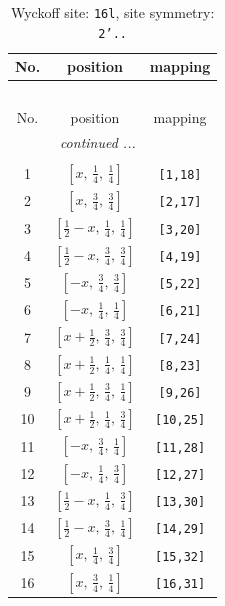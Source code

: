 \documentclass[fleqn,8pt]{jsarticle}
\begin{document}
\renewcommand{\arraystretch}{1.2}
\begin{longtable}{ccc}
\caption{Wyckoff site: {\tt 16l}, site symmetry: {\tt 2'..}}
 \\
 \hline \hline
No. & position & mapping \\ \hline \endfirsthead

\multicolumn{2}{l}{\tablename\ \thetable{}} \\
 \hline \hline
No. & position & mapping \\ \hline \endhead

 \hline \hline
\multicolumn{2}{r}{\footnotesize\it continued ...} \\ \endfoot

 \hline \hline
\multicolumn{2}{r}{} \\ \endlastfoot

1 & $\left[ x,\, \frac{1}{4},\, \frac{1}{4} \right]$ & {\tt [1,18]} \\ \hline
2 & $\left[ x,\, \frac{3}{4},\, \frac{3}{4} \right]$ & {\tt [2,17]} \\ \hline
3 & $\left[ \frac{1}{2} - x,\, \frac{1}{4},\, \frac{1}{4} \right]$ & {\tt [3,20]} \\ \hline
4 & $\left[ \frac{1}{2} - x,\, \frac{3}{4},\, \frac{3}{4} \right]$ & {\tt [4,19]} \\ \hline
5 & $\left[ - x,\, \frac{3}{4},\, \frac{3}{4} \right]$ & {\tt [5,22]} \\ \hline
6 & $\left[ - x,\, \frac{1}{4},\, \frac{1}{4} \right]$ & {\tt [6,21]} \\ \hline
7 & $\left[ x + \frac{1}{2},\, \frac{3}{4},\, \frac{3}{4} \right]$ & {\tt [7,24]} \\ \hline
8 & $\left[ x + \frac{1}{2},\, \frac{1}{4},\, \frac{1}{4} \right]$ & {\tt [8,23]} \\ \hline
9 & $\left[ x + \frac{1}{2},\, \frac{3}{4},\, \frac{1}{4} \right]$ & {\tt [9,26]} \\ \hline
10 & $\left[ x + \frac{1}{2},\, \frac{1}{4},\, \frac{3}{4} \right]$ & {\tt [10,25]} \\ \hline
11 & $\left[ - x,\, \frac{3}{4},\, \frac{1}{4} \right]$ & {\tt [11,28]} \\ \hline
12 & $\left[ - x,\, \frac{1}{4},\, \frac{3}{4} \right]$ & {\tt [12,27]} \\ \hline
13 & $\left[ \frac{1}{2} - x,\, \frac{1}{4},\, \frac{3}{4} \right]$ & {\tt [13,30]} \\ \hline
14 & $\left[ \frac{1}{2} - x,\, \frac{3}{4},\, \frac{1}{4} \right]$ & {\tt [14,29]} \\ \hline
15 & $\left[ x,\, \frac{1}{4},\, \frac{3}{4} \right]$ & {\tt [15,32]} \\ \hline
16 & $\left[ x,\, \frac{3}{4},\, \frac{1}{4} \right]$ & {\tt [16,31]} \\
\end{longtable}
\end{document}
